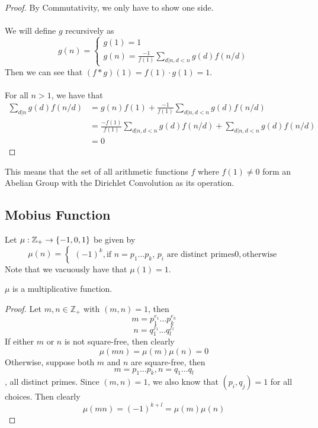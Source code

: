\begin{proof}
By Commutativity, we only have to show one side.\\\\
We will define $g$ recursively as
\[ g(n) = \begin{cases} 
      g(1) = 1 \\
      g(n) = \frac{-1}{f(1)} \sum_{d | n, d < n} g(d)f(n/d)
   \end{cases}
\]
Then we can see that $(f * g)(1) = f(1) \cdot g(1) = 1$.\\\\
For all $n > 1$, we have that
\begin{align*}
    \sum_{d | n} g(d)f(n/d) &= g(n)f(1) + \frac{-1}{f(1)} \sum_{d | n, d < n} g(d)f(n/d)\\
    &= \frac{-f(1)}{f(1)} \sum_{d |n , d< n} g(d) f(n/d) + \sum_{d | n, d < n} g(d)f(n/d) \tag*{Rewrite $g(n)$ with its reucrsive definition}\\
    &= 0
\end{align*}
\end{proof}

\begin{remark}
This means that the set of all arithmetic functions $f$ where $f(1) \neq 0$ form an Abelian Group with the Dirichlet Convolution as its operation.
\end{remark}

\subsection{Mobius Function}

\begin{definition}
Let $\mu: \mathbb{Z}_+ \to \{-1, 0, 1\}$ be given by
\[\mu(n) = \begin{cases}
(-1)^k, \text{if $n = p_1...p_k$, $p_i$ are distinct primes}
0, \text{otherwise}
\end{cases}\]
Note that we vacuously have that $\mu(1) = 1$.
\end{definition}

\begin{lemma}
$\mu$ is a multiplicative function.
\end{lemma}

\begin{proof}
Let $m, n  \in \mathbb{Z}_+$ with $(m, n) = 1$, then
\[m = p_1^{e_1}...p_k^{e_k}\]
\[n = q_1^{f_1}...q_l^{f_l}\]
If either $m$ or $n$ is not square-free, then clearly
\[\mu(mn) = \mu(m)\mu(n) = 0\]
Otherwise, suppose both $m$ and $n$ are square-free, then
\[m = p_1...p_k, n = q_1...q_l\]
, all distinct primes. Since $(m, n) = 1$, we also know that $(p_i, q_j) = 1$ for all choices. Then clearly
\[\mu(mn) = (-1)^{k + l} = \mu(m)\mu(n)\]
\end{proof}

